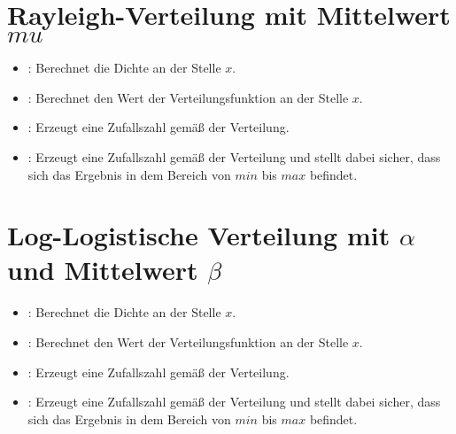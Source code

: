 \section{Rayleigh-Verteilung mit Mittelwert \texorpdfstring{$mu$}{mu}}

\begin{itemize}

\item
{}:
Berechnet die Dichte an der Stelle $x$.

\item
{}:
Berechnet den Wert der Verteilungsfunktion an der Stelle $x$.

\item
{}:
Erzeugt eine Zufallszahl gemäß der Verteilung.

\item
{}:
Erzeugt eine Zufallszahl gemäß der Verteilung und stellt dabei sicher, dass sich das Ergebnis in dem Bereich von $min$ bis $max$ befindet.

\end{itemize}



\section{Log-Logistische Verteilung mit \texorpdfstring{$\alpha$}{alpha} und Mittelwert \texorpdfstring{$\beta$}{beta}}

\begin{itemize}

\item
{}:
Berechnet die Dichte an der Stelle $x$.

\item
{}:
Berechnet den Wert der Verteilungsfunktion an der Stelle $x$.

\item
{}:
Erzeugt eine Zufallszahl gemäß der Verteilung.

\item
{}:
Erzeugt eine Zufallszahl gemäß der Verteilung und stellt dabei sicher, dass sich das Ergebnis in dem Bereich von $min$ bis $max$ befindet.

\end{itemize}



